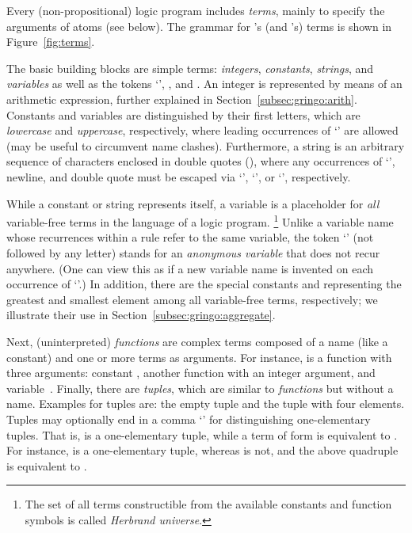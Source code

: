 Every (non-propositional) logic program includes \emph{terms},
mainly to specify the arguments of atoms (see below).
The grammar for \gringo's (and \clingo's) terms is shown in Figure~\ref{fig:terms}.

The basic building blocks are simple terms:
\emph{integers}, \emph{constants}, \emph{strings}, and \emph{variables}
as well as the tokens `', , and .
An integer is represented by means of an arithmetic expression,
further explained in Section~\ref{subsec:gringo:arith}.
Constants and variables are distinguished by their first letters,
which are \emph{lowercase} and \emph{uppercase}, respectively,
where leading occurrences of `' are allowed
(may be useful to circumvent name clashes).
Furthermore, a string is an arbitrary sequence of characters
enclosed in double quotes (),
where any occurrences of `\code{\textbackslash}', newline, and double quote
must be escaped via `\code{\textbackslash\textbackslash}', `',
or `', respectively.

While a constant or string represents itself,
a variable is a placeholder for \emph{all} variable-free terms
in the language of a logic program.%
\footnote{The set of all terms constructible from the available
          constants and function symbols is called \emph{Herbrand universe}.}
Unlike a variable name whose recurrences within a rule refer to the same variable,
the token `' (not followed by any letter)
stands for an \emph{anonymous variable} that does not recur anywhere.
(One can view this as if a new variable name is invented on each occurrence of `'.)
In addition, there are the special constants  and 
representing the greatest and smallest element among all variable-free terms, respectively;
we illustrate their use in Section~\ref{subsec:gringo:aggregate}.

Next, (uninterpreted) \emph{functions} are complex terms composed of a name (like a constant)
and one or more terms as arguments.
For instance,
is a function with three arguments:
constant , another function 
with an integer argument, and variable~.
Finally, there are \emph{tuples},
which are similar to \emph{functions} but without a name.
Examples for tuples are:
the empty tuple \code{()} and
the tuple  with four elements.
Tuples may optionally end in a comma `\code{,}'
for distinguishing one-elementary tuples.
That is,  is a one-elementary tuple,
while a term of form  is equivalent to .
For instance,  is a one-elementary tuple, whereas  is not,
and the above quadruple is equivalent to .

